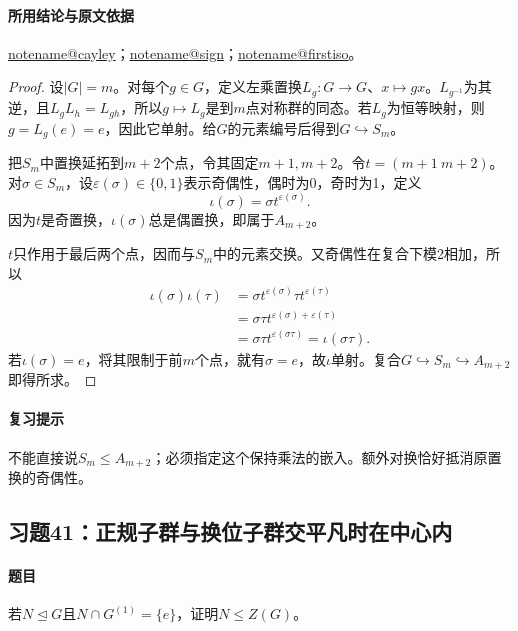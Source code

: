 \documentclass[UTF8,a4paper,11pt,fontset=windows]{ctexart}
\makeatletter
\newcommand{\noteref}[1]{\hyperref[note:#1]{\csname notename@#1\endcsname}}
\newcommand{\exref}[2]{\hyperref[ex:#1:#2]{第#1章习题#2}}
\makeatother
\begin{document}
\paragraph{所用结论与原文依据}
\noteref{cayley}；\noteref{sign}；\noteref{firstiso}。


\begin{proof}
设$|G|=m$。对每个$g\in G$，定义左乘置换$L_g:G\to G$、$x\mapsto gx$。$L_{g^{-1}}$为其逆，且$L_gL_h=L_{gh}$，所以$g\mapsto L_g$是到$m$点对称群的同态。若$L_g$为恒等映射，则$g=L_g(e)=e$，因此它单射。给$G$的元素编号后得到$G\hookrightarrow S_m$。

把$S_m$中置换延拓到$m+2$个点，令其固定$m+1,m+2$。令$t=(m+1\ m+2)$。对$\sigma\in S_m$，设$\varepsilon(\sigma)\in\{0,1\}$表示奇偶性，偶时为0，奇时为1，定义
\[
\iota(\sigma)=\sigma t^{\varepsilon(\sigma)}.
\]
因为$t$是奇置换，$\iota(\sigma)$总是偶置换，即属于$A_{m+2}$。

$t$只作用于最后两个点，因而与$S_m$中的元素交换。又奇偶性在复合下模2相加，所以
\begin{align*}
\iota(\sigma)\iota(\tau)
&=\sigma t^{\varepsilon(\sigma)}\tau t^{\varepsilon(\tau)}\\
&=\sigma\tau t^{\varepsilon(\sigma)+\varepsilon(\tau)}\\
&=\sigma\tau t^{\varepsilon(\sigma\tau)}
=\iota(\sigma\tau).
\end{align*}
若$\iota(\sigma)=e$，将其限制于前$m$个点，就有$\sigma=e$，故$\iota$单射。复合$G\hookrightarrow S_m\hookrightarrow A_{m+2}$即得所求。
\end{proof}

\paragraph{复习提示}
不能直接说$S_m\le A_{m+2}$；必须指定这个保持乘法的嵌入。额外对换恰好抵消原置换的奇偶性。


\subsection{习题41：\texorpdfstring{正规子群与换位子群交平凡时在中心内}{正规子群与换位子群交平凡时在中心内}}
\label{ex:2:41}

\paragraph{题目}
若$N\trianglelefteq G$且$N\cap G^{(1)}=\{e\}$，证明$N\le Z(G)$。
\end{document}
